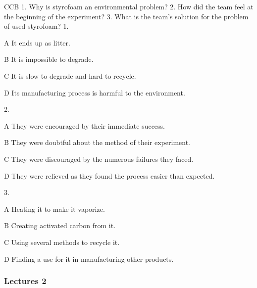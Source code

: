 \begin{enumerate}
	CCB
	1. Why is styrofoam an environmental problem?
	2. How did the team feel at the beginning of the experiment?
	3. What is the team's solution for the problem of used styrofoam?
	1.
	
	A
	It ends up as litter.
	
	B
	It is impossible to degrade.
	
	C
	It is slow to degrade and hard to recycle.
	
	D
	Its manufacturing process is harmful to the environment.
	
	2.
	
	A
	They were encouraged by their immediate success.
	
	B
	They were doubtful about the method of their experiment.
	
	C
	They were discouraged by the numerous failures they faced.
	
	D
	They were relieved as they found the process easier than expected.
	
	3.
	
	A
	Heating it to make it vaporize.
	
	B
	Creating activated carbon from it.
	
	C
	Using several methods to recycle it.
	
	D
	Finding a use for it in manufacturing other products.
\end{enumerate}


\subsubsection{Lectures 2}

